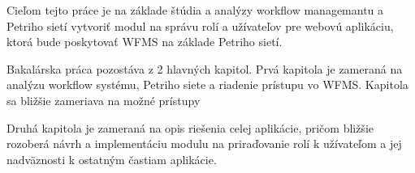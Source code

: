 Cieľom tejto práce je na základe štúdia a analýzy workflow managemantu  a Petriho sietí vytvoriť modul na správu rolí a užívateľov pre webovú aplikáciu, ktorá bude poskytovať WFMS na základe Petriho sietí. 

Bakalárska práca pozostáva z 2 hlavných kapitol. Prvá kapitola je zameraná na analýzu workflow systému, Petriho siete a riadenie prístupu vo WFMS. Kapitola sa bližšie zameriava na možné prístupy 

Druhá kapitola je zameraná na opis riešenia celej aplikácie, pričom bližšie rozoberá návrh a implementáciu modulu na priraďovanie rolí k užívateľom a jej nadväznosti k ostatným častiam aplikácie. 


 




















